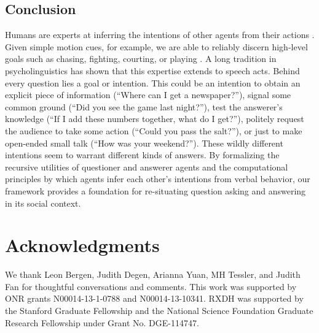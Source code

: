 \documentclass[11pt, floatsintext]{apa6}
\begin{document}
\subsection{Conclusion}
Humans are experts at inferring the intentions of other agents from their actions \cite{TomaselloCarpenter___Moll05_IntentionsCulturalCognition, BakerSaxeTenenbaum09_ActionUnderstandingInversePlanning}. Given simple motion cues, for example, we are able to reliably discern high-level goals such as chasing, fighting, courting, or playing \cite{BarrettToddMillerBlythe05_IntentionFromMotionCues, HeiderSimmel44_Animacy}. A long tradition in psycholinguistics has shown that this expertise extends to speech acts.  Behind every question lies a goal or intention. This could be an intention to obtain an explicit piece of information (``Where can I get a newspaper?''), signal some common ground (``Did you see the game last night?''), test the answerer's knowledge (``If I add these numbers together, what do I get?''), politely request the audience to take some action (``Could you pass the salt?''), or just to make open-ended small talk (``How was your weekend?''). These wildly different intentions seem to warrant different kinds of answers. %
By formalizing the recursive utilities of questioner and answerer agents and the computational principles by which agents infer each other's intentions from verbal behavior, our framework provides a foundation for re-situating question asking and answering in its social context.

\section{\bf Acknowledgments}
\small
\noindent We thank Leon Bergen, Judith Degen, Arianna Yuan, MH Tessler, and Judith Fan for thoughtful conversations and comments. This work was supported by ONR grants N00014-13-1-0788 and N00014-13-10341. RXDH was supported by the Stanford Graduate Fellowship and the National Science Foundation Graduate Research Fellowship under Grant No. DGE-114747.



\end{document}
